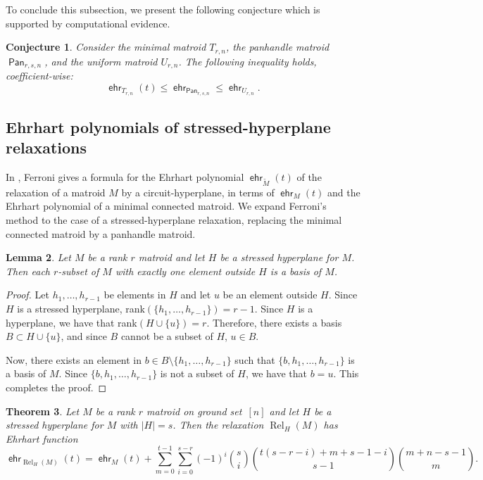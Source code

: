 \documentclass[11pt]{amsart}
\newtheorem{theorem}{Theorem}[section]
\newtheorem{conjecture}[theorem]{Conjecture}
\newtheorem{lemma}[theorem]{Lemma}
\theoremstyle{definition}
\newcommand{\0}{\emptyset}
\DeclareMathOperator{\ehr}{\mathsf{ehr}}
\DeclareMathOperator{\Rel}{Rel} %
\newcommand{\sm}{\setminus}
\DeclareMathOperator{\Pan}{\mathsf{Pan}} %
\newcommand{\andres}[1]{\par \noindent
  \framebox{\begin{minipage}[c]{0.95 \textwidth}\color{blue} Andr\'es Note:
      #1 \end{minipage}\color{black}}\par}
\begin{document}
To conclude this subsection, we present the following conjecture which is supported by computational evidence. 

\begin{conjecture}
Consider the minimal matroid  $T_{r,n}$, the panhandle matroid $\Pan_{r,s,n}$, and the uniform matroid $U_{r,n}$.
The following inequality holds, coefficient-wise:
$$\ehr_{T_{r,n}}(t)\leq \ehr_{\Pan_{r,s,n}} \leq \ehr_{U_{r,n}}.$$
\end{conjecture}

\subsection{Ehrhart polynomials of stressed-hyperplane relaxations}

In \cite{Ferroni2021A}, Ferroni gives a formula for the Ehrhart polynomial $\ehr_{\widetilde M}(t)$ of the relaxation of a matroid $M$ by a circuit-hyperplane, in terms of $\ehr_M(t)$ and the Ehrhart polynomial of a minimal connected matroid.
We expand Ferroni's method to the case of a stressed-hyperplane relaxation, replacing the minimal connected matroid by a panhandle matroid.

\begin{lemma}\label{lem:relax-stressed}
Let $M$ be a rank $r$ matroid and let $H$ be a stressed hyperplane for $M$. 
Then each $r$-subset of $M$ with exactly one element outside $H$ is a basis of $M$.
\end{lemma}

\begin{proof}
Let $h_1,\dots,h_{r-1}$ be elements in $H$ and let $u$ be an element outside $H$. Since $H$ is a stressed hyperplane, rank$(\{h_1,\dots,h_{r-1}\})=r-1$.
Since $H$ is a hyperplane, we have that rank$(H\cup \{u\})=r$.
Therefore, there exists a basis $B\subset H\cup \{u\}$, and since $B$ cannot be a subset of $H$, $u\in B$.

Now, there exists an element in $b\in B\sm \{h_1,\dots,h_{r-1}\}$ such that $\{b,h_1,\dots,h_{r-1}\}$ is a basis of $M$.
Since $\{b,h_1,\dots,h_{r-1}\}$ is not a subset of $H$, we have that $b=u$. This completes the proof.
\end{proof}


\begin{theorem}\label{prop:Ehrhart-relaxation}
Let $M$ be a rank $r$ matroid on ground set~$[n]$ and let $H$ be a stressed hyperplane for $M$ with $|H|=s$.
Then the relaxation $\Rel_H(M)$ has Ehrhart function
\[
\ehr_{\Rel_H(M)}(t)=\ehr_{{M}}(t)+\sum_{m=0}^{t-1}\sum_{i=0}^{s-r}(-1)^i\binom{s}{i}\binom{t(s-r-i)+m+s-1-i}{s-1}\binom{m+n-s-1}{m}.
\]
\end{theorem}
\end{document}
